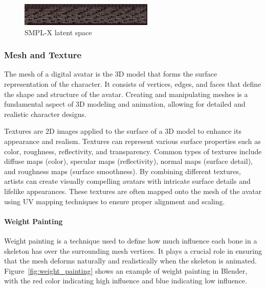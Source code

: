 \documentclass[../../main.tex]{subfiles}
\begin{document}
\begin{figure} 
  \centering \includegraphics[width = 2.5in]{chapters/background_work/images/latent_space_smplx.png} 
  \caption{SMPL-X latent space} 
  \label{fig:latent_space_smplx} 
\end{figure}

\subsubsection{Mesh and Texture}
\label{ch:background_work:sign_language_synthesis:3d_techniques:mesh_and_texture}

The mesh of a digital avatar is the 3D model that forms the surface representation of the character. It consists of vertices, edges, and faces that define the shape and structure of the avatar. Creating and manipulating meshes is a fundamental aspect of 3D modeling and animation, allowing for detailed and realistic character designs.

Textures are 2D images applied to the surface of a 3D model to enhance its appearance and realism. Textures can represent various surface properties such as color, roughness, reflectivity, and transparency. Common types of textures include diffuse maps (color), specular maps (reflectivity), normal maps (surface detail), and roughness maps (surface smoothness). By combining different textures, artists can create visually compelling avatars with intricate surface details and lifelike appearances. These textures are often mapped onto the mesh of the avatar using UV mapping techniques to ensure proper alignment and scaling.

\paragraph{Weight Painting}
\label{ch:background_work:sign_language_synthesis:3d_techniques:mesh_and_texture:weight_painting}

Weight painting is a technique used to define how much influence each bone in a skeleton has over the surrounding mesh vertices. It plays a crucial role in ensuring that the mesh deforms naturally and realistically when the skeleton is animated. Figure~\ref{fig:weight_painting} shows an example of weight painting in Blender, with the red color indicating high influence and blue indicating low influence.
\end{document}

